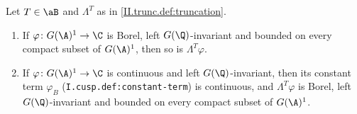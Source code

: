 Let $T\in\aB$ and $\Lambda^T$ as in \cref{II.trunc.def:truncation}.
\begin{enumerate}
  \item[(a)] If $\varphi\colon G(\A)^1\to\C$ is Borel, left $G(\Q)$-invariant and bounded on every compact subset of $G(\A)^1$, then so is
  $\Lambda^T\varphi$.
  \item[(b)] If $\varphi\colon G(\A)^1\to\C$ is continuous and left $G(\Q)$-invariant, then its constant term $\varphi_B$ (\texttt{I.cusp.def:constant-term})
  is continuous, and $\Lambda^T\varphi$ is Borel, left $G(\Q)$-invariant and bounded on every compact subset of $G(\A)^1$.
\end{enumerate}
